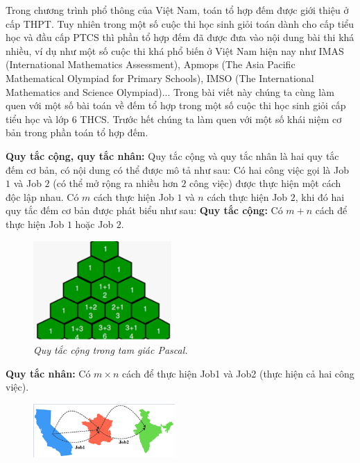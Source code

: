\begin{multicols}{2}
	Trong chương trình phổ thông của Việt Nam, toán tổ hợp đếm được giới thiệu ở cấp THPT. Tuy nhiên trong một số cuộc thi học sinh giỏi toán dành cho cấp tiểu học và đầu cấp PTCS thì phần tổ hợp đếm đã được đưa vào nội dung bài thi khá nhiều, ví dụ như một số cuộc thi khá phổ biến ở Việt Nam hiện nay như IMAS (International Mathematics Assessment), Apmops (The Asia Pacific Mathematical Olympiad for Primary Schools), IMSO (The International Mathematics and Science Olympiad)...
	\vskip 0.1cm
	Trong bài viết này chúng ta cùng làm quen với một số bài toán về đếm tổ hợp trong một số cuộc thi học sinh giỏi cấp tiểu học và lớp $6$ THCS.
	\vskip 0.1cm
	Trước hết chúng ta làm quen với một số khái niệm cơ bản trong phần toán tổ hợp đếm.
	\begin{multicols}{2}
		\textbf{Quy tắc cộng, quy tắc nhân:} Quy tắc cộng và quy tắc nhân là hai quy tắc đếm cơ bản, có nội dung có thể được mô tả như sau:
		\vskip 0.1cm
		Có hai công việc gọi là Job $1$ và Job $2$ (có thể mở rộng ra nhiều hơn $2$ công việc) được thực hiện một cách độc lập nhau. Có $m$ cách thực hiện Job $1$ và $n$ cách thực hiện Job $2$, khi đó hai quy tắc đếm cơ bản được phát biểu như sau:
		\vskip 0.1cm
		\textbf{Quy tắc cộng:} Có $m+n$ cách để thực hiện Job $1$ hoặc Job $2$.
		\begin{figure}[H]
			\centering
			\vspace*{-10pt}
			\captionsetup{labelformat=empty, justification=centering}
			\includegraphics[width=0.47\textwidth]{_1}
			\caption{\small\textit{Quy tắc cộng trong tam giác Pascal.}}
			\vspace*{-5pt}
		\end{figure}
		\textbf{Quy tắc nhân:} Có $m\times n$ cách để thực hiện Job1 và Job2 (thực hiện cả hai công việc).
		\begin{figure}[H]
			\centering
			\vspace*{5pt}
			\captionsetup{labelformat=empty, justification=centering}
			\includegraphics[width=0.48\textwidth]{_2}

\end{figure}
\end{multicols}
\end{multicols}
